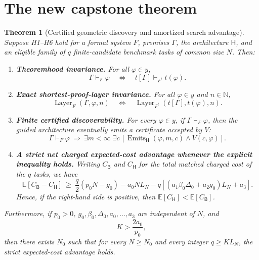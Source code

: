 \documentclass[11pt,letterpaper]{article}
\newtheorem{theorem}{Theorem}[section]
\theoremstyle{definition}
\theoremstyle{remark}
\newcommand{\Layer}{\operatorname{Layer}}
\newcommand{\Emits}{\operatorname{Emits}}
\newcommand{\E}{\mathbb{E}}
\newcommand{\N}{\mathbb{N}}
\newcommand{\Hsys}{\mathsf H}
\newcommand{\Bsys}{\mathsf B}
\begin{document}
\section{The new capstone theorem}
\begin{theorem}[Certified geometric discovery and amortized search advantage]\label{thm:capstone}
Suppose H1--H6 hold for a formal system $F$, premises $\Gamma$, the architecture $\Hsys$, and an eligible family of $q$ finite-candidate benchmark tasks of common size $N$. Then:
\begin{enumerate}[leftmargin=2.1em,label=\textbf{T\arabic*.},itemsep=0.5em]
 \item \textbf{Theoremhood invariance.} For all $\varphi\in y$,
 \[\Gamma\vdash_F\varphi\quad\Longleftrightarrow\quad t[\Gamma]\vdash_{F^t}t(\varphi).\]
 \item \textbf{Exact shortest-proof-layer invariance.} For all $\varphi\in y$ and $n\in\N$,
 \[\Layer_F(\Gamma,\varphi,n)\quad\Longleftrightarrow\quad \Layer_{F^t}(t[\Gamma],t(\varphi),n).\]
 \item \textbf{Finite certified discoverability.} For every $\varphi\in y$, if $\Gamma\vdash_F\varphi$, then the guided architecture eventually emits a certificate accepted by $V$:
 \[\Gamma\vdash_F\varphi\ \Longrightarrow\ \exists m<\infty\;\exists c\,[\Emits_{\Hsys}(\varphi,m,c)\land V(c,\varphi)].\]
 \item \textbf{A strict net charged expected-cost advantage whenever the explicit inequality holds.} Writing $C_{\Bsys}$ and $C_{\Hsys}$ for the \emph{total} matched charged cost of the $q$ tasks, we have
 \begin{equation}\label{eq:main}
 \boxed{\E[C_{\Bsys}-C_{\Hsys}]\ \ge\ \frac q2(p_0N-g_0)-a_0NL_N-q[(a_1\beta_0\Delta_0+a_2g_0)L_N+a_3].}
 \end{equation}
 Hence, if the right-hand side is positive, then $\E[C_{\Hsys}]<\E[C_{\Bsys}]$.
\end{enumerate}
Furthermore, if $p_0>0$, $g_0,\beta_0,\Delta_0,a_0,\ldots,a_3$ are independent of $N$, and
\begin{equation}\label{eq:K}
 K>\frac{2a_0}{p_0},
\end{equation}
then there exists $N_0$ such that for every $N\ge N_0$ and every integer $q\ge K L_N$, the strict expected-cost advantage holds.
\end{theorem}
\end{document}
